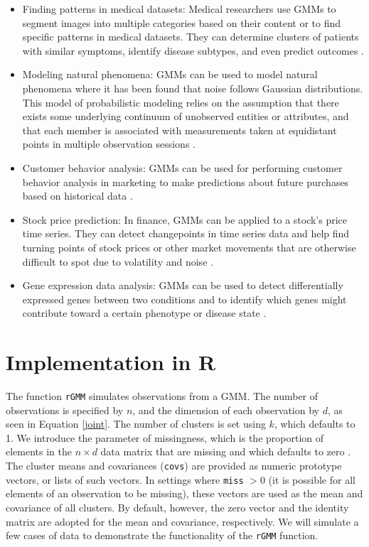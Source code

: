 \documentclass[12pt]{article}
\begin{document}
\begin{itemize}
\item
  Finding patterns in medical datasets: Medical researchers use GMMs to
  segment images into multiple categories based on their content or to
  find specific patterns in medical datasets. They can determine
  clusters of patients with similar symptoms, identify disease subtypes,
  and even predict outcomes \citep{riaz2020gaussian}.
\item
  Modeling natural phenomena: GMMs can be used to model natural
  phenomena where it has been found that noise follows Gaussian
  distributions. This model of probabilistic modeling relies on the
  assumption that there exists some underlying continuum of unobserved
  entities or attributes, and that each member is associated with
  measurements taken at equidistant points in multiple observation
  sessions \citep{xi2023deep}.
\item
  Customer behavior analysis: GMMs can be used for performing customer
  behavior analysis in marketing to make predictions about future
  purchases based on historical data \citep{melzi2017dedicated}.
\item
  Stock price prediction: In finance, GMMs can be applied to a stock's
  price time series. They can detect changepoints in time series data
  and help find turning points of stock prices or other market movements
  that are otherwise difficult to spot due to volatility and noise
  \citep{gopinathan2023stock}.
\item
  Gene expression data analysis: GMMs can be used to detect
  differentially expressed genes between two conditions and to identify
  which genes might contribute toward a certain phenotype or disease
  state \citep{mcnicholas2010model}.
\end{itemize}

\hypertarget{implementation-in-r}{%
\section{Implementation in R}\label{implementation-in-r}}

The function \texttt{rGMM} simulates observations from a GMM. The number
of observations is specified by \(n\), and the dimension of each
observation by \(d\), as seen in Equation \ref{joint}. The number of
clusters is set using \(k\), which defaults to 1. We introduce the
parameter of missingness, which is the proportion of elements in the
\(n \times d\) data matrix that are missing and which defaults to zero
\citep{McCaw2019.12.20.884551}. The cluster means and covariances
(\texttt{covs}) are provided as numeric prototype vectors, or lists of
such vectors. In settings where \texttt{miss} \(> 0\) (it is possible
for all elements of an observation to be missing), these vectors are
used as the mean and covariance of all clusters. By default, however,
the zero vector and the identity matrix are adopted for the mean and
covariance, respectively. We will simulate a few cases of data to
demonstrate the functionality of the \texttt{rGMM} function.
\end{document}
